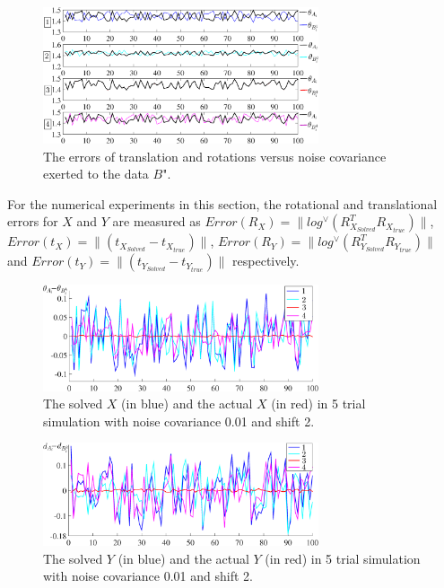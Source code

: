 \documentclass[letterpaper, 10 pt, conference]{ieeeconf}  %
\begin{document}
\begin{figure}
\centering
\includegraphics[width=3.2in]{fig2.eps}
\caption{
The errors of translation and rotations versus noise covariance exerted to the data $B$".
}
\label{fig3}
\end{figure}


For the numerical experiments in this section, the rotational and translational errors for $X$ and $Y$ are measured as  $Error(R_X) = \parallel log^{\vee} (R_{X_{Solved}}^{T}R_{X_{true}})\parallel$, $Error(t_X) = \parallel (t_{X_{Solved}}-t_{X_{true}})\parallel$, $Error(R_Y) = \parallel log^{\vee} (R_{Y_{Solved}}^{T}R_{Y_{true}})\parallel$ and $Error(t_Y) = \parallel (t_{Y_{Solved}}-t_{Y_{true}})\parallel$ respectively.

\begin{center}
\begin{figure}
\centering
\includegraphics[width=3.2in]{fig4.eps}
\caption{
The solved $X$ (in blue) and the actual $X$ (in red) in 5 trial simulation with noise covariance 0.01 and shift 2.
}
\label{fig4}
\end{figure}
\end{center}

\begin{center}
\begin{figure}
\centering
\includegraphics[width=3.2in]{fig5.eps}
\caption{
The solved $Y$ (in blue) and the actual $Y$ (in red) in 5 trial simulation with noise covariance 0.01 and shift 2.
}
\label{fig5}
\end{figure}
\end{center}
\end{document}
